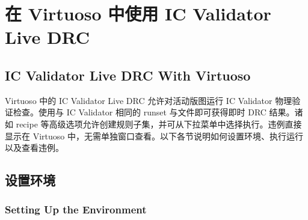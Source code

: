 
\section{在 Virtuoso 中使用 IC Validator Live DRC}
\subsection*{IC Validator Live DRC With Virtuoso}

Virtuoso 中的 IC Validator Live DRC 允许对活动版图运行 IC Validator 物理验证检查。使用与 IC Validator 相同的 runset 与文件即可获得即时 DRC 结果。诸如 recipe 等高级选项允许创建规则子集，并可从下拉菜单中选择执行。违例直接显示在 Virtuoso 中，无需单独窗口查看。以下各节说明如何设置环境、执行运行以及查看违例。

\subsection{设置环境}
\subsubsection*{Setting Up the Environment}

